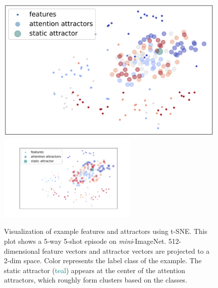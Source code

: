 \begin{figure}[h!]
\centering
\iflatexml
\includegraphics[width=4\textwidth]{figures/attractor_tsne.png}
\else
\includegraphics[width=0.6\textwidth,trim={1cm 0.5cm 1.6cm 1cm},clip]{figures/attractor_tsne.pdf}
\fi
\caption{Visualization of example features and attractors using t-SNE. This plot shows a 5-way
5-shot episode on \textit{mini}-ImageNet. 512-dimensional feature vectors and attractor vectors
are projected to a 2-dim space. Color represents the label class of the example. The static
attractor (\textcolor{teal}{teal}) appears at the center of the attention attractors, which roughly
form clusters based on the classes.}
\label{fig:attractorviz}
\end{figure}
